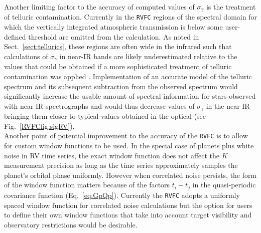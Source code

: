 Another limiting factor to the accuracy of computed values of $\sigma_{\gamma}$
is the treatment of telluric contamination. Currently in the \texttt{RVFC}
regions of the spectral domain for which the vertically integrated atmospheric
transmission is below some user-defined threshold are omitted from the
calculation. As noted in Sect.~\ref{sect:tellurics}, these regions are often
wide in the infrared such that calculations of $\sigma_{\gamma}$ in near-IR
bands are likely underestimated relative to the values that could be obtained
if a more sophisticated treatment of telluric contamination was applied
\citep[e.g.][]{artigau14,bedell19}. Implementation of an accurate model of the
telluric spectrum and its subsequent subtraction from the observed spectrum
would significantly increase the usable amount of spectral information for stars
observed with near-IR spectrographs and would thus decrease values of
$\sigma_{\gamma}$ in the near-IR bringing them closer to typical values obtained
in the optical (see Fig.~\ref{RVFCfig:sigRV}). \\

Another point of potential improvement to the accuracy of the \texttt{RVFC} is
to allow for custom window functions to be used. In the special case of planets
plus white noise in RV time series, the exact window function does not affect the
$K$ measurement precision \sigK{} as long as the time series approximately
samples the planet's orbital phase uniformly. However when correlated noise
persists, the form of the window function matters because of the factors
$t_i-t_j$ in the quasi-periodic covariance function (Eq.~\ref{eq:GpQp}).
Currently the \texttt{RVFC}
adopts a uniformly spaced window function for correlated noise calculations but
the option for users to define their own window functions that take into account
target visibility and observatory restrictions would be desirable.


